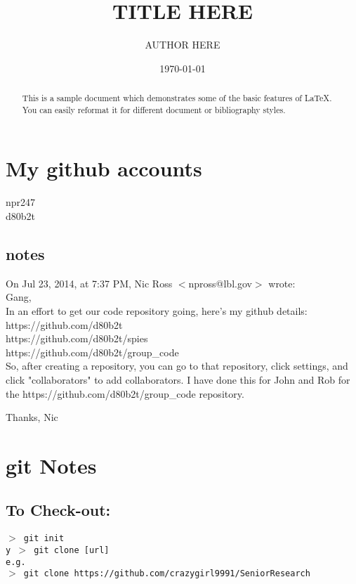 \documentclass[11pt,a4paper]{article}
\begin{document}
\title{TITLE HERE}
\author{AUTHOR HERE}
\date{\today}
\maketitle



\begin{abstract}
This is a sample document which demonstrates some of the basic features
of \LaTeX.  You can easily reformat it for different document 
or bibliography styles.
\end{abstract}


\section{My github accounts}
npr247\\
d80b2t\\


\subsection{notes}
On Jul 23, 2014, at 7:37 PM, Nic Ross $<$npross@lbl.gov$>$ wrote:\\

Gang, \\

In an effort to get our code repository going, here's my github details: \\
	https://github.com/d80b2t \\
	https://github.com/d80b2t/spies\\
	https://github.com/d80b2t/group\_code\\

So, after creating a repository, you can go to that repository, click 
settings, and click "collaborators" to add collaborators. I have 
done this for John and Rob for the https://github.com/d80b2t/group\_code
repository. 

Thanks, 
Nic



\section{git Notes}

    \subsection{To Check-out:}
   {\tt  $>$ git init\\y
    $>$ git clone [url] \\
     e.g.\\ 
     $>$ git clone https://github.com/crazygirl9991/SeniorResearch\\
   }
\end{document}
